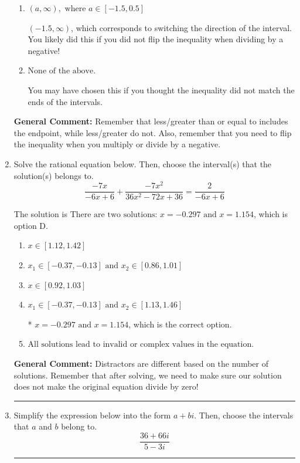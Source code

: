 \documentclass{extbook}[14pt]
\newcommand{\litem}[1]{\item #1

\rule{\textwidth}{0.4pt}}
\begin{document}
\begin{enumerate}
{\begin{enumerate}[label=\Alph*.]
 $(1.5, \infty)$, which corresponds to switching the direction of the interval AND negating the endpoint. You likely did this if you did not flip the inequality when dividing by a negative as well as not moving values over to a side properly.
\item \( (a, \infty), \text{ where } a \in [-1.5, 0.5] \)

 $(-1.5, \infty)$, which corresponds to switching the direction of the interval. You likely did this if you did not flip the inequality when dividing by a negative!
\item \( \text{None of the above}. \)

You may have chosen this if you thought the inequality did not match the ends of the intervals.
\end{enumerate}

\textbf{General Comment:} Remember that less/greater than or equal to includes the endpoint, while less/greater do not. Also, remember that you need to flip the inequality when you multiply or divide by a negative.
}
\litem{
Solve the rational equation below. Then, choose the interval(s) that the solution(s) belongs to.
\[ \frac{-7x}{-6x + 6} + \frac{-7x^{2}}{36x^{2} -72 x + 36} = \frac{2}{-6x + 6} \]

The solution is \( \text{There are two solutions: } x = -0.297 \text{ and } x = 1.154 \), which is option D.\begin{enumerate}[label=\Alph*.]
\item \( x \in [1.12,1.42] \)


\item \( x_1 \in [-0.37, -0.13] \text{ and } x_2 \in [0.86,1.01] \)


\item \( x \in [0.92,1.03] \)


\item \( x_1 \in [-0.37, -0.13] \text{ and } x_2 \in [1.13,1.46] \)

* $x = -0.297 \text{ and } x = 1.154$, which is the correct option.
\item \( \text{All solutions lead to invalid or complex values in the equation.} \)


\end{enumerate}

\textbf{General Comment:} Distractors are different based on the number of solutions. Remember that after solving, we need to make sure our solution does not make the original equation divide by zero!
}
\litem{
Simplify the expression below into the form $a+bi$. Then, choose the intervals that $a$ and $b$ belong to.
\[ \frac{36 + 66 i}{5 - 3 i} \]

}
\end{enumerate}
\end{document}
